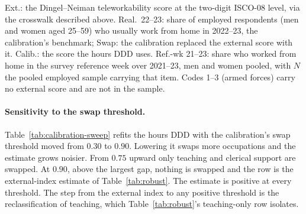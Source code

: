 \begin{table}[htbp]
\centering
\begin{threeparttable}
\caption{External, realized and calibrated WFH exposure by two-digit occupation}\label{tab:exposure-scores}
\renewcommand{\baselinestretch}{1}\scriptsize
\setlength{\tabcolsep}{3pt}
\begingroup
\makeatletter
\let\audit@parboxrestore\@arrayparboxrestore
\def\@arrayparboxrestore{\audit@parboxrestore\raggedright\let\\\tabularnewline}
\makeatother

\endgroup
\begin{tablenotes}\footnotesize
\item Ext.: the Dingel--Neiman teleworkability score \citep{dingel2020} at the two-digit ISCO-08
level, via
the crosswalk described above. Real.\ 22--23: share of employed
respondents (men and women aged 25--59) who usually work from home in 2022--23,
the calibration's benchmark; Swap: the calibration replaced the external score with it.
Calib.: the score the hours DDD uses. Ref.-wk 21--23: share who worked from home in the survey
reference week over 2021--23, men and women pooled, with $N$ the pooled employed sample carrying
that item. Codes 1--3 (armed forces) carry no external score and are not in the sample.
\end{tablenotes}
\end{threeparttable}
\end{table}

\paragraph{Sensitivity to the swap threshold.}
Table~\ref{tab:calibration-sweep} refits the hours DDD with the calibration's swap threshold
moved from $0.30$ to $0.90$. Lowering it swaps more occupations and the estimate grows noisier.
From $0.75$ upward only teaching and clerical support are swapped. At $0.90$, above the largest
gap, nothing is swapped and the row is the external-index estimate of Table~\ref{tab:robust}.
The estimate is positive at every threshold. The step from the external index to any positive
threshold is the reclassification of teaching, which Table~\ref{tab:robust}'s teaching-only row
isolates.

